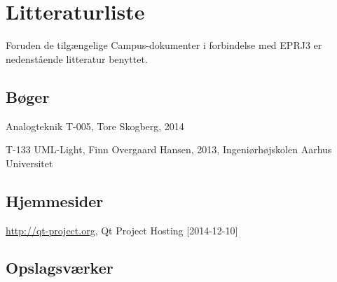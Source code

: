 \chapter{Litteraturliste}
Foruden de tilgængelige Campus-dokumenter i forbindelse med EPRJ3 er nedenstående litteratur benyttet. 

\section{Bøger}
Analogteknik T-005, Tore Skogberg, 2014

T-133 UML-Light, Finn Overgaard Hansen, 2013, Ingeniørhøjskolen Aarhus Universitet

\section{Hjemmesider}

\url{http://qt-project.org}, Qt Project Hosting [2014-12-10]


\section{Opslagsværker}

